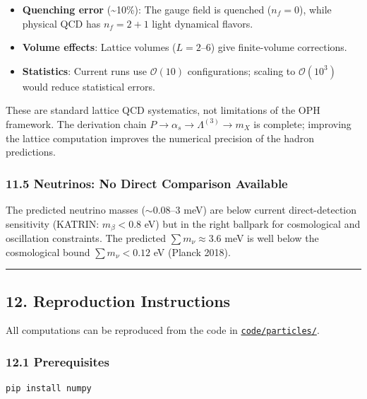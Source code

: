 \begin{itemize}
\tightlist
\item
  \textbf{Quenching error} (\textasciitilde10\%): The gauge field is quenched (\(n_f = 0\)), while physical QCD has \(n_f = 2+1\) light dynamical flavors.
\item
  \textbf{Volume effects}: Lattice volumes (\(L = 2\)--\(6\)) give finite-volume corrections.
\item
  \textbf{Statistics}: Current runs use \(\mathcal{O}(10)\) configurations; scaling to \(\mathcal{O}(10^3)\) would reduce statistical errors.
\end{itemize}

These are standard lattice QCD systematics, not limitations of the OPH framework. The derivation chain \(P \to \alpha_s \to \Lambda^{(3)} \to m_X\) is complete; improving the lattice computation improves the numerical precision of the hadron predictions.

\subsubsection{11.5 Neutrinos: No Direct Comparison Available}\label{115-neutrinos-no-direct-comparison-available}

The predicted neutrino masses (\(\sim 0.08\)--\(3\) meV) are below current direct-detection sensitivity (KATRIN: \(m_\beta < 0.8\) eV) but in the right ballpark for cosmological and oscillation constraints. The predicted \(\sum m_\nu \approx 3.6\) meV is well below the cosmological bound \(\sum m_\nu < 0.12\) eV (Planck 2018).

\begin{center}\rule{0.5\linewidth}{0.5pt}\end{center}

\subsection{12. Reproduction Instructions}\label{12-reproduction-instructions}

All computations can be reproduced from the code in \href{../code/particles/}{\texttt{code/particles/}}.

\subsubsection{12.1 Prerequisites}\label{121-prerequisites}

\begin{verbatim}
pip install numpy
\end{verbatim}

